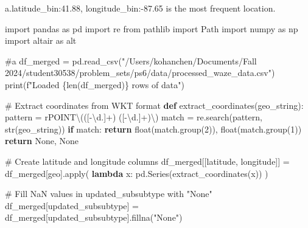 \documentclass[
  letterpaper,
  DIV=11,
  numbers=noendperiod]{scrartcl}
\newenvironment{Shaded}{\begin{snugshade}}{\end{snugshade}}
\newcommand{\BuiltInTok}[1]{\textcolor[rgb]{0.00,0.23,0.31}{#1}}
\newcommand{\CommentTok}[1]{\textcolor[rgb]{0.37,0.37,0.37}{#1}}
\newcommand{\ControlFlowTok}[1]{\textcolor[rgb]{0.00,0.23,0.31}{\textbf{#1}}}
\newcommand{\DecValTok}[1]{\textcolor[rgb]{0.68,0.00,0.00}{#1}}
\newcommand{\ImportTok}[1]{\textcolor[rgb]{0.00,0.46,0.62}{#1}}
\newcommand{\KeywordTok}[1]{\textcolor[rgb]{0.00,0.23,0.31}{\textbf{#1}}}
\newcommand{\NormalTok}[1]{\textcolor[rgb]{0.00,0.23,0.31}{#1}}
\newcommand{\OperatorTok}[1]{\textcolor[rgb]{0.37,0.37,0.37}{#1}}
\newcommand{\SpecialCharTok}[1]{\textcolor[rgb]{0.37,0.37,0.37}{#1}}
\newcommand{\SpecialStringTok}[1]{\textcolor[rgb]{0.13,0.47,0.30}{#1}}
\newcommand{\StringTok}[1]{\textcolor[rgb]{0.13,0.47,0.30}{#1}}
\newcommand{\VariableTok}[1]{\textcolor[rgb]{0.07,0.07,0.07}{#1}}
\newcommand{\VerbatimStringTok}[1]{\textcolor[rgb]{0.13,0.47,0.30}{#1}}
\begin{document}
a.latitude\_bin:41.88, longitude\_bin:-87.65 is the most frequent
location.

\begin{Shaded}
\begin{Highlighting}[]
\ImportTok{import}\NormalTok{ pandas }\ImportTok{as}\NormalTok{ pd}
\ImportTok{import}\NormalTok{ re}
\ImportTok{from}\NormalTok{ pathlib }\ImportTok{import}\NormalTok{ Path}
\ImportTok{import}\NormalTok{ numpy }\ImportTok{as}\NormalTok{ np}
\ImportTok{import}\NormalTok{ altair }\ImportTok{as}\NormalTok{ alt}

\CommentTok{\#a}
\NormalTok{df\_merged }\OperatorTok{=}\NormalTok{ pd.read\_csv(}\StringTok{"/Users/kohanchen/Documents/Fall 2024/student30538/problem\_sets/ps6/data/processed\_waze\_data.csv"}\NormalTok{)}
\BuiltInTok{print}\NormalTok{(}\SpecialStringTok{f"Loaded }\SpecialCharTok{\{}\BuiltInTok{len}\NormalTok{(df\_merged)}\SpecialCharTok{\}}\SpecialStringTok{ rows of data"}\NormalTok{)}

\CommentTok{\# Extract coordinates from WKT format}
\KeywordTok{def}\NormalTok{ extract\_coordinates(geo\_string):}
\NormalTok{    pattern }\OperatorTok{=} \VerbatimStringTok{r\textquotesingle{}POINT\textbackslash{}(([{-}\textbackslash{}d.]+) ([{-}\textbackslash{}d.]+)\textbackslash{})\textquotesingle{}}
\NormalTok{    match }\OperatorTok{=}\NormalTok{ re.search(pattern, }\BuiltInTok{str}\NormalTok{(geo\_string))}
    \ControlFlowTok{if}\NormalTok{ match:}
        \ControlFlowTok{return} \BuiltInTok{float}\NormalTok{(match.group(}\DecValTok{2}\NormalTok{)), }\BuiltInTok{float}\NormalTok{(match.group(}\DecValTok{1}\NormalTok{))}
    \ControlFlowTok{return} \VariableTok{None}\NormalTok{, }\VariableTok{None}

\CommentTok{\# Create latitude and longitude columns}
\NormalTok{df\_merged[[}\StringTok{\textquotesingle{}latitude\textquotesingle{}}\NormalTok{, }\StringTok{\textquotesingle{}longitude\textquotesingle{}}\NormalTok{]] }\OperatorTok{=}\NormalTok{ df\_merged[}\StringTok{\textquotesingle{}geo\textquotesingle{}}\NormalTok{].}\BuiltInTok{apply}\NormalTok{(}
    \KeywordTok{lambda}\NormalTok{ x: pd.Series(extract\_coordinates(x))}
\NormalTok{)}

\CommentTok{\# Fill NaN values in updated\_subsubtype with "None"}
\NormalTok{df\_merged[}\StringTok{\textquotesingle{}updated\_subsubtype\textquotesingle{}}\NormalTok{] }\OperatorTok{=}\NormalTok{ df\_merged[}\StringTok{\textquotesingle{}updated\_subsubtype\textquotesingle{}}\NormalTok{].fillna(}\StringTok{"None"}\NormalTok{)}


\end{Highlighting}
\end{Shaded}
\end{document}
